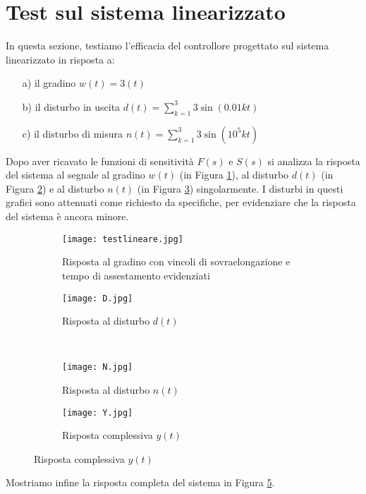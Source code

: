 \documentclass[a4paper, 11pt]{article}
\begin{document}
\clearpage

\section{Test sul sistema linearizzato}

In questa sezione, testiamo l'efficacia del controllore progettato sul sistema linearizzato in risposta a:
\begin{itemize}
	\item[a)] il gradino $w(t)=3(t)$
	\item[b)] il disturbo in uscita $d(t)=\sum_{k=1}^{3}3\sin(0.01kt)$
	\item[c)] il disturbo di misura $n(t)=\sum_{k=1}^{3}3\sin(10^5kt)$
\end{itemize}
Dopo aver ricavato le funzioni di sensitività $F(s)$ e $S(s)$ si analizza la risposta del sistema al segnale
al gradino $w(t)$ (in Figura \ref{fig:testlin}), al disturbo $d(t)$ (in Figura \ref{fig:D}) e al disturbo $n(t)$ (in Figura \ref{fig:N}) singolarmente. I disturbi in questi grafici sono attenuati come richiesto da specifiche, per evidenziare che la risposta del sistema è ancora minore.

\begin{figure}[h!]
	\centering
	\begin{subfigure}{0.49\linewidth}
		\centering
		\texttt{[image: testlineare.jpg]}
		\caption{Risposta al gradino con vincoli di sovraelongazione e tempo di assestamento evidenziati}
		\label{fig:testlin}
	\end{subfigure}
	\hfill
	\begin{subfigure}{0.49\linewidth}
		\texttt{[image: D.jpg]}
		\caption{Risposta al disturbo $d(t)$}
		\label{fig:D}
	\end{subfigure}
	\\
	\begin{subfigure}{0.49\linewidth}
		\texttt{[image: N.jpg]}
		\caption{Risposta al disturbo $n(t)$}
		\label{fig:N}
	\end{subfigure}
	\hfill
	\begin{subfigure}{0.49\linewidth}
	\texttt{[image: Y.jpg]}
	\caption{Risposta complessiva $y(t)$}
	\label{fig:Y}
\end{subfigure}
\end{figure}

Mostriamo infine la risposta completa del sistema in Figura \ref{fig:Y}.


\clearpage
\end{document}
